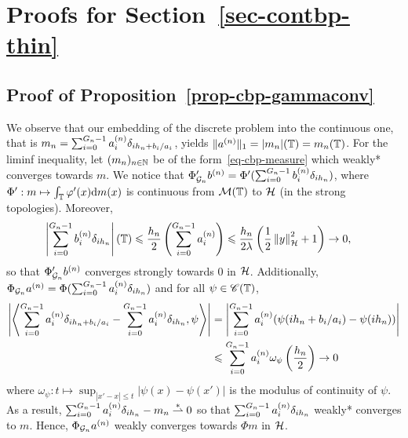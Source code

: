 
\section{Proofs for Section~\ref{sec-contbp-thin}}

\subsection{Proof of Proposition~\ref{prop-cbp-gammaconv}}
\label{prop-cbp-gammaconv-proof}


We observe that our embedding of the discrete problem into the continuous one, that is $m_n=\sum_{i=0}^{{G_n}-1} a^{(n)}_{i} \delta_{i{h_n}+b_i/a_i }$, yields $\|a^{(n)}\|_1=| m_n |(\mathbb{T})={m_n}(\mathbb{T})$.
For the liminf inequality, let $(m_n)_{n\in\mathbb{N}}$ be of the form~\eqref{eq-cbp-measure} which weakly* converges towards $m$. We notice that $\Phi'_{\mathcal{G}_n}b^{(n)}= \Phi' (\sum_{i=0}^{{G_n}-1}b^{(n)}_i\delta_{i{h_n}})$, where $\Phi':m\mapsto \int_{\mathbb{T}} \varphi'(x)\mathrm{d} m(x)$ is continuous from $\mathcal{M}(\mathbb{T})$ to $\mathcal{H}$ (in the strong topologies). Moreover,
\begin{align*}
  \left|\sum_{i=0}^{{G_n}-1}b^{(n)}_i\delta_{i{h_n}}\right|(\mathbb{T}) &\leqslant \frac{{h_n}}{2}\left(\sum_{i=0}^{{G_n}-1}a^{(n)}_i\right)  
    \leqslant \frac{{h_n}}{2\lambda}\left(\frac{1}{2}\left\lVert y \right\rVert_{\mathcal{H}}^2+1\right)\to 0,
  \end{align*}
  so that $\Phi'_{\mathcal{G}_n}b^{(n)}$ converges strongly towards $0$ in $\mathcal{H}$.
Additionally, $\Phi_{\mathcal{G}_n}a^{(n)}= \Phi (\sum_{i=0}^{{G_n}-1}a^{(n)}_i\delta_{i{h_n}})$ and for all $\psi\in \mathscr{C}(\mathbb{T})$, 
  \begin{align*}
    \left|\left\langle\sum_{i=0}^{{G_n}-1} a_{i}^{(n)} \delta_{i{h_n}+b_i/a_i }- \sum_{i=0}^{{G_n}-1} a_{i}^{(n)} \delta_{i{h_n}}, \psi \right\rangle\right| &= \left|\sum_{i=0}^{{G_n}-1} a_{i}^{(n)} (\psi(i{h_n}+b_i/a_i)-\psi(i{h_n}))\right|\\
    &\leqslant \sum_{i=0}^{{G_n}-1} a_{i}^{(n)} \omega_\psi\left(\frac{{h_n}}{2} \right) \to 0
  \end{align*}
  where $\omega_\psi: t\mapsto \sup_{|x'-x|\leq t}|\psi(x)-\psi(x')|$ is the modulus of continuity of $\psi$. As a result, $\sum_{i=0}^{{G_n}-1} a_{i}^{(n)} \delta_{i{h_n}}-m_n \stackrel{*}{\rightharpoonup} 0$ so that $\sum_{i=0}^{{G_n}-1} a_{i}^{(n)} \delta_{i{h_n}}$ weakly* converges to $m$. Hence, $\Phi_{\mathcal{G}_n}a^{(n)}$ weakly converges towards $\Phi m$ in $\mathcal{H}$.
